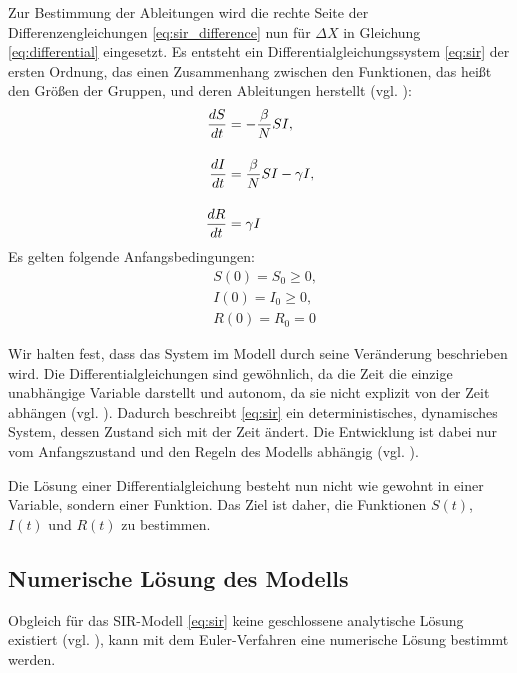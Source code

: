 \documentclass[../main.tex]{subfiles}
\begin{document}
    Zur Bestimmung der Ableitungen wird die rechte Seite der Differenzengleichungen \eqref{eq:sir_difference} nun für $\Delta X$ in Gleichung \eqref{eq:differential} eingesetzt.
    Es entsteht ein Differentialgleichungssystem \eqref{eq:sir} der ersten Ordnung, das einen Zusammenhang zwischen den Funktionen, das heißt den Größen der Gruppen, und deren Ableitungen herstellt (vgl. \cite[S. 713]{KM27}):
    \begin{equation}
      \label{eq:sir}
      \setlength{\jot}{0.5cm}
      \begin{aligned}
        \frac{dS}{dt} &= - \frac{\beta}{N} S I, \\
        \frac{dI}{dt} &= \frac{\beta}{N} S I - \gamma I, \\
        \frac{dR}{dt} &= \gamma I
      \end{aligned}
    \end{equation}
    Es gelten folgende Anfangsbedingungen:
    \begin{equation*}
        \begin{aligned}
        &S(0) = S_0 \geq 0, \\
        &I(0) = I_0 \geq 0, \\
        &R(0) = R_0 = 0
        \end{aligned}
    \end{equation*}
    
    Wir halten fest, dass das System im Modell durch seine Veränderung beschrieben wird.
    Die Differentialgleichungen sind gewöhnlich, da die Zeit die einzige unabhängige Variable darstellt und autonom, da sie nicht explizit von der Zeit abhängen (vgl. \cite[S. 41f, 534]{Heu13}).
    Dadurch beschreibt \eqref{eq:sir} ein deterministisches, dynamisches System, dessen Zustand sich mit der Zeit ändert.
    Die Entwicklung ist dabei nur vom Anfangszustand und den Regeln des Modells abhängig (vgl. \cite[S. 25]{Bra08}).

    Die Lösung einer Differentialgleichung besteht nun nicht wie gewohnt in einer Variable, sondern einer Funktion. Das Ziel ist daher, die Funktionen $S(t)$, $I(t)$ und $R(t)$ zu bestimmen.

    \subsection{Numerische Lösung des Modells}
    \label{ssec:simulation1}
    Obgleich für das SIR-Modell \eqref{eq:sir} keine geschlossene analytische Lösung existiert (vgl. \cite[S.93]{Bac11}), kann mit dem Euler-Verfahren eine numerische Lösung bestimmt werden.
    
\end{document}
